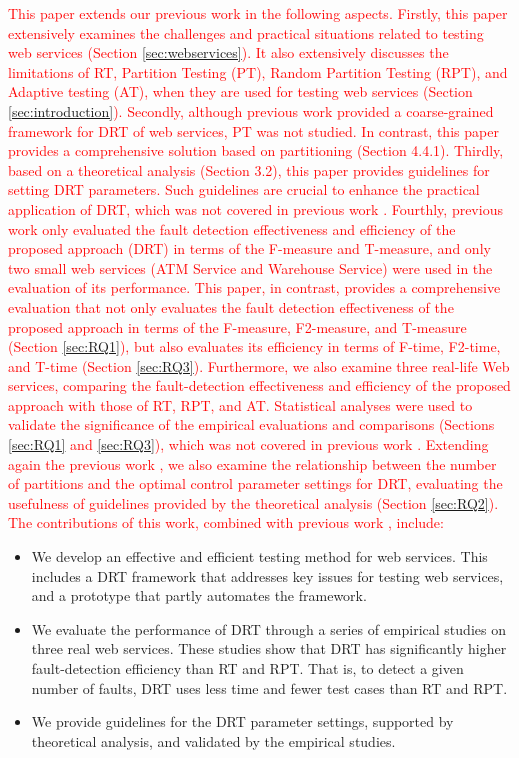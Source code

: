 \documentclass[10pt,journal,compsoc]{IEEEtran}
\begin{document}
\textcolor{red}{This paper extends our previous work \cite{sun2012towards} in the following aspects. Firstly, this paper extensively examines the challenges and practical situations related to testing web services (Section \ref{sec:webservices}). It also extensively discusses the limitations of RT, Partition Testing (PT), Random Partition Testing (RPT), and Adaptive testing (AT), when they are used for testing web services (Section \ref{sec:introduction}). Secondly, although previous work \cite{sun2012towards} provided a coarse-grained framework for DRT of web services, PT was not studied. In contrast, this paper provides a comprehensive solution based on partitioning (Section 4.4.1). Thirdly, based on a theoretical analysis (Section 3.2), this paper provides guidelines for setting DRT parameters. Such guidelines are crucial to enhance the practical application of DRT, which was not covered in previous work \cite{sun2012towards}. Fourthly, previous work \cite{sun2012towards} only evaluated the fault detection effectiveness and efficiency of the proposed approach (DRT) in terms of the F-measure and T-measure, and only two small web services (ATM Service and Warehouse Service) were used in the evaluation of its performance. This paper, in contrast, provides a comprehensive evaluation that not only evaluates the fault detection effectiveness of the proposed approach in terms of the F-measure, F2-measure, and T-measure (Section \ref{sec:RQ1}), but also evaluates its efficiency in terms of F-time, F2-time, and T-time (Section \ref{sec:RQ3}). Furthermore, we also examine three real-life Web services, comparing the fault-detection effectiveness and efficiency of the proposed approach with those of RT, RPT, and AT. Statistical analyses were used to validate the significance of the empirical evaluations and comparisons (Sections \ref{sec:RQ1} and \ref{sec:RQ3}), which was not covered in previous work \cite{sun2012towards}. Extending again the previous work \cite{sun2012towards}, we also examine the relationship between the number of partitions and the optimal control parameter settings for DRT, evaluating the usefulness of guidelines provided by the theoretical analysis (Section \ref{sec:RQ2}). The contributions of this work, combined with previous work \cite{sun2012towards}, include:}

\begin{itemize}
  \item
  We develop an effective and efficient testing method for web services.
  This includes a DRT framework that addresses key issues for testing web services, and a prototype that partly automates the framework.
  \item
  We evaluate the performance of DRT through a series of empirical studies on three real web services.
  These studies show that DRT has significantly higher fault-detection efficiency than RT and RPT. That is, to detect a given number of faults, DRT uses less time and fewer test cases than RT and RPT.
  \item
  We provide guidelines for the DRT parameter settings, supported by theoretical analysis, and validated by the empirical studies.
\end{itemize}
\end{document}
